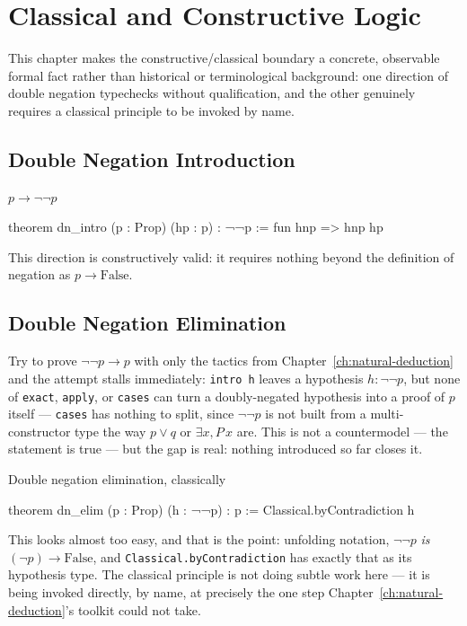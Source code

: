 \chapter{Classical and Constructive Logic}
\label{ch:classical-constructive}

This chapter makes the constructive/classical boundary a concrete,
observable formal fact rather than historical or terminological
background: one direction of double negation typechecks without
qualification, and the other genuinely requires a classical
principle to be invoked by name.

\section{Double Negation Introduction}

\begin{experiment}{$p \to \lnot\lnot p$}
\begin{lean}
theorem dn_intro (p : Prop) (hp : p) : ¬¬p :=
  fun hnp => hnp hp
\end{lean}
This direction is constructively valid: it requires nothing beyond
the definition of negation as $p \to \mathrm{False}$.
\end{experiment}

\section{Double Negation Elimination}

Try to prove $\lnot\lnot p \to p$ with only the tactics from
Chapter~\ref{ch:natural-deduction} and the attempt stalls
immediately: \texttt{intro h} leaves a hypothesis
$h : \lnot\lnot p$, but none of \texttt{exact}, \texttt{apply}, or
\texttt{cases} can turn a doubly-negated hypothesis into a proof of
$p$ itself — \texttt{cases} has nothing to split, since $\lnot\lnot p$
is not built from a multi-constructor type the way $p \lor q$ or
$\exists x, P\,x$ are. This is not a countermodel — the statement is
true — but the gap is real: nothing introduced so far closes it.

\begin{experiment}{Double negation elimination, classically}
\begin{lean}
theorem dn_elim (p : Prop) (h : ¬¬p) : p :=
  Classical.byContradiction h
\end{lean}
This looks almost too easy, and that is the point: unfolding
notation, $\lnot\lnot p$ \emph{is} $(\lnot p) \to \mathrm{False}$,
and \texttt{Classical.byContradiction} has exactly that as its
hypothesis type. The classical principle is not doing subtle work
here — it is being invoked directly, by name, at precisely the one
step Chapter~\ref{ch:natural-deduction}'s toolkit could not take.
\end{experiment}

